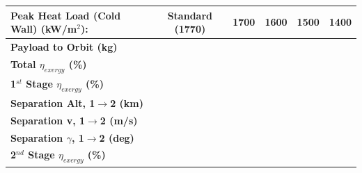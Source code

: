 \begin{table}[ht]
	
	\centering
	\begin{tabular}{l c c c c c } 
		\hline \textbf{Peak Heat Load (Cold Wall)} (kW/m$^2$):
		& Standard (1770)
		& 1700
		& 1600
		& 1500
		& 1400
		\\
		\hline \textbf{Payload to Orbit (kg)}
		& \textbf{\PayloadToOrbitheatLimStandard}
		& \textbf{\PayloadToOrbitheatLimSeventeenHundred}
		& \textbf{\PayloadToOrbitheatLimSixteenHundred}
		& \textbf{\PayloadToOrbitheatLimFifteenHundred}
		& \textbf{\PayloadToOrbitheatLimFourteenHundred}
		\\
		\textbf{Total $\eta_{exergy}$ (\%)}
		& \textbf{\totalExergyEffheatLimStandard}
		& \textbf{\totalExergyEffheatLimSeventeenHundred}
		& \textbf{\totalExergyEffheatLimSixteenHundred}
		& \textbf{\totalExergyEffheatLimFifteenHundred}
		& \textbf{\totalExergyEffheatLimFourteenHundred}
		\\
		\hline 
		\textbf{1$^{st}$ Stage $\eta_{exergy}$ (\%)}
		& \textbf{\firstExergyEffheatLimStandard}
		& \textbf{\firstExergyEffheatLimSeventeenHundred}
		& \textbf{\firstExergyEffheatLimSixteenHundred}
		& \textbf{\firstExergyEffheatLimFifteenHundred}
		& \textbf{\firstExergyEffheatLimFourteenHundred}
		\\
		\textbf{Separation Alt, 1$\rightarrow$2 (km)}
		& \firstsecondSeparationAltheatLimStandard
		& \firstsecondSeparationAltheatLimSeventeenHundred
		& \firstsecondSeparationAltheatLimSixteenHundred
		& \firstsecondSeparationAltheatLimFifteenHundred
		& \firstsecondSeparationAltheatLimFourteenHundred
		\\
		\textbf{Separation v, 1$\rightarrow$2 (m/s)}
		& \firstsecondSeparationvheatLimStandard
		& \firstsecondSeparationvheatLimSeventeenHundred
		& \firstsecondSeparationvheatLimSixteenHundred
		& \firstsecondSeparationvheatLimFifteenHundred
		& \firstsecondSeparationvheatLimFourteenHundred
		\\
		\textbf{Separation $\gamma$, 1$\rightarrow$2 (deg)}
		& \firstsecondSeparationgammaheatLimStandard
		& \firstsecondSeparationgammaheatLimSeventeenHundred
		& \firstsecondSeparationgammaheatLimSixteenHundred
		& \firstsecondSeparationgammaheatLimFifteenHundred
		& \firstsecondSeparationgammaheatLimFourteenHundred
		\\
		\hline 
		\textbf{2$^{nd}$ Stage $\eta_{exergy}$ (\%)}
		& \textbf{\secondExergyEffheatLimStandard}
		& \textbf{\secondExergyEffheatLimSeventeenHundred}
		& \textbf{\secondExergyEffheatLimSixteenHundred}
		& \textbf{\secondExergyEffheatLimFifteenHundred}

\end{tabular}
\end{table}
